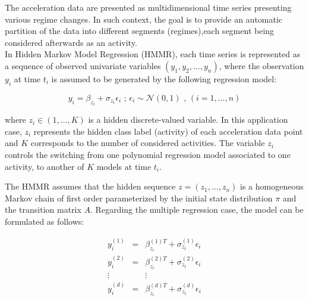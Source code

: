 \documentclass[11pt,a4paper,oneside]{article}
\begin{document}
The acceleration data are presented as multidimensional time series presenting various regime changes. In such context, the goal is to provide an automatic partition of the data into different segments (regimes),each segment being considered afterwards as an activity. \ \\

In Hidden Markov Model Regression (HMMR), each time series is represented as a sequence of observed univariate variables $(y_1, y_2, \ldots , y_n)$, where the observation $y_i$ at time $t_i$ is assumed to be generated by the following regression model: 

\begin{equation}
y_i = \beta_{z_i} + \sigma_{z_t}\epsilon_i \text{ ; } \epsilon_i \sim \mathcal{N}(0,1)  \text{ , } (i = 1, \ldots, n) 
\end{equation}


where $z_i \in (1, \ldots ,K) $ is a hidden discrete-valued variable. In this application case, $z_i$ represents the hidden class label (activity) of each acceleration data point and $K$ corresponds to the number of considered activities. The variable $z_i$ controls the switching from one polynomial regression model associated to one activity, to another of $K$ models at time $t_i$. 

The HMMR assumes that the hidden sequence $ z = (z_1, \ldots, z_n)$ is a homogeneous Markov chain of first order parameterized by the initial state distribution $\pi$ and the transition matrix $A$. Regarding the multiple regression case, the model can be formulated as follows:

\begin{eqnarray}
y_i^{(1)} & = & \beta^{(1)T}_{z_i} + \sigma_{z_t}^{(1)} \epsilon_i \\
y_i^{(2)} & = & \beta^{(2)T}_{z_i} + \sigma_{z_t}^{(2)} \epsilon_i \\
\vdots & & \vdots \\
y_i^{(d)} & = & \beta^{(d)T}_{z_i} + \sigma_{z_t}^{(d)} \epsilon_i \\
\end{eqnarray}

\end{document}
